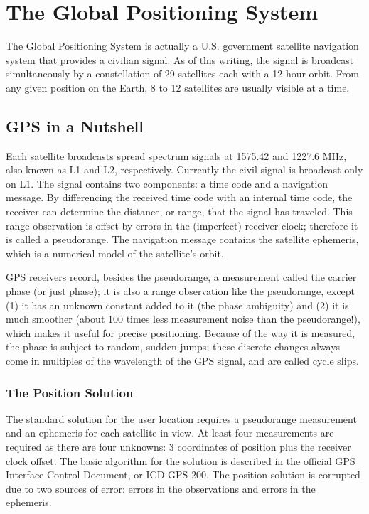 \chapter{The Global Positioning System}

The Global Positioning System is actually a U.S. government satellite navigation system that provides a civilian signal. As of this writing, the signal is broadcast simultaneously by a constellation of 29 satellites each with a 12 hour orbit. From any given position on the Earth, 8 to 12 satellites are usually visible at a time.

\section{GPS in a Nutshell}

Each satellite broadcasts spread spectrum signals at 1575.42 and 1227.6 MHz, also known as L1 and L2, respectively. Currently the civil signal is broadcast only on L1. The signal contains two components: a time code and a navigation message. By differencing the received time code with an internal time code, the receiver can determine the distance, or range, that the signal has traveled. This range observation is offset by errors in the (imperfect) receiver clock; therefore it is called a pseudorange. The navigation message contains the satellite ephemeris, which is a numerical model of the satellite's orbit.

GPS receivers record, besides the pseudorange, a measurement called the carrier phase (or just phase); it is also a range observation like the pseudorange, except (1) it has an unknown constant added to it (the phase ambiguity) and (2) it is much smoother (about 100 times less measurement noise than the pseudorange!), which makes it useful for precise positioning. Because of the way it is measured, the phase is subject to random, sudden jumps; these discrete changes always come in multiples of the wavelength of the GPS signal, and are called cycle slips.


\subsection{The Position Solution}

The standard solution for the user location requires a pseudorange measurement and an ephemeris for each satellite in view. At least four measurements are required as there are four unknowns: 3 coordinates of position plus the receiver clock offset. The basic algorithm for the solution is described in the official GPS Interface Control Document, or ICD-GPS-200. The position solution is corrupted due to two sources of error: errors in the observations and errors in the ephemeris.


